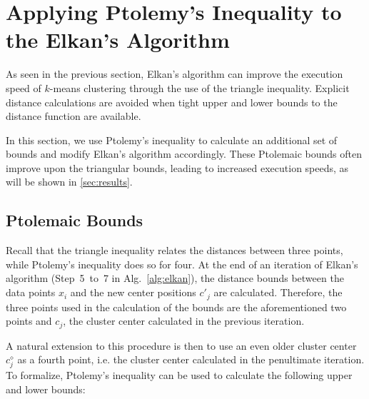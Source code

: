 \newcommand{\prev}{\diamond}

\section{Applying Ptolemy's Inequality to the Elkan's Algorithm}
\label{sec:contrib}

As seen in the previous section,
Elkan's algorithm can improve the execution speed of $k$-means clustering through the use of the triangle inequality.
Explicit distance calculations are avoided when tight upper and lower bounds to the distance function are available.

In this section, we use Ptolemy's inequality to calculate an additional set of bounds and modify Elkan's algorithm accordingly.
These Ptolemaic bounds often improve upon the triangular bounds, leading to increased execution speeds, as will be shown in \autoref{sec:results}.


\subsection{Ptolemaic Bounds}
Recall that the triangle inequality relates the distances between three points,
while Ptolemy's inequality does so for four.
At the end of an iteration of Elkan's algorithm (Step~5~to~7 in Alg.~\autoref{alg:elkan}),
the distance bounds between the data points $x_i$ and the new center positions $c'_j$ are calculated.
Therefore, the three points used in the calculation of the bounds are the aforementioned two points and $c_j$, the cluster center calculated in the previous iteration.

A natural extension to this procedure is then to use an even older cluster center $c^\prev_j$ as a fourth point,
i.e. the cluster center calculated in the penultimate iteration.
To formalize, Ptolemy's inequality can be used to calculate the following upper and lower bounds:

